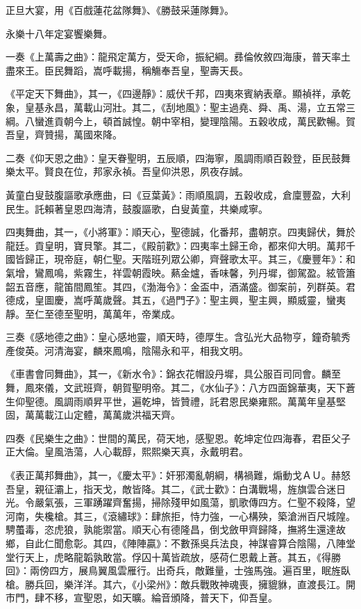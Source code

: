 正旦大宴，用《百戲蓮花盆隊舞》、《勝鼓采蓮隊舞》。

永樂十八年定宴饗樂舞。

一奏《上萬壽之曲》：龍飛定萬方，受天命，振紀綱。彞倫攸敘四海康，普天率土盡來王。臣民舞蹈，嵩呼載揚，稱觴奉吾皇，聖壽天長。

《平定天下舞曲》，其一，《四邊靜》：威伏千邦，四夷來賓納表章。顯禎祥，承乾象，皇基永昌，萬載山河壯。其二，《刮地風》：聖主過堯、舜、禹、湯，立五常三綱。八蠻進貢朝今上，頓首誠惶。朝中宰相，變理陰陽。五穀收成，萬民歡暢。賀吾皇，齊贊揚，萬國來降。

二奏《仰天恩之曲》：皇天眷聖明，五辰順，四海寧，風調雨順百穀登，臣民鼓舞樂太平。賢良在位，邦家永禎。吾皇仰洪恩，夙夜存誠。

黃童白叟鼓腹謳歌承應曲，曰《豆葉黃》：雨順風調，五穀收成，倉廩豐盈，大利民生。託賴著皇恩四海清，鼓腹謳歌，白叟黃童，共樂咸寧。

四夷舞曲，其一，《小將軍》：順天心，聖德誠，化番邦，盡朝京。四夷歸伏，舞於龍廷。貢皇明，寶貝擎。其二，《殿前歡》：四夷率土歸王命，都來仰大明。萬邦千國皆歸正，現帝庭，朝仁聖。天階班列眾公卿，齊聲歌太平。其三，《慶豐年》：和氣增，鸞鳳鳴，紫霧生，祥雲朝霞映。爇金爐，香味馨，列丹墀，御駕盈。絃管簫韶五音應，龍笛間鳳笙。其四，《渤海令》：金盃中，酒滿盛。御案前，列群英。君德成，皇圖慶，嵩呼萬歲聲。其五，《過門子》：聖主興，聖主興，顯威靈，蠻夷靜。至仁至德至聖明，萬萬年，帝業成。

三奏《感地德之曲》：皇心感地靈，順天時，德厚生。含弘光大品物亨，鐘奇毓秀產俊英。河清海宴，麟來鳳鳴，陰陽永和平，相我文明。

《車書會同舞曲》，其一，《新水令》：錦衣花帽設丹墀，具公服百司同會。麟至舞，鳳來儀，文武班齊，朝賀聖明帝。其二，《水仙子》：八方四面錦華夷，天下蒼生仰聖德。風調雨順昇平世，遍乾坤，皆贊禮，託君恩民樂雍熙。萬萬年皇基堅固，萬萬載江山定體，萬萬歲洪福天齊。

四奏《民樂生之曲》：世間的萬民，荷天地，感聖恩。乾坤定位四海春，君臣父子正大倫。皇風浩蕩，人心載醇，熙熙樂天真，永戴明君。

《表正萬邦舞曲》，其一，《慶太平》：奸邪濁亂朝綱，構禍難，煽動戈ＡＵ。赫怒吾皇，親征灞上，指天戈，敵皆降。其二，《武士歡》：白溝戰場，旌旗雲合迷日光。令嚴氣張，三軍踴躍齊奮揚，掃除殘甲如風蕩，凱歌傳四方。仁聖不殺降，望河南，失欃槍。其三，《滾繡球》：肆旅拒，恃力強，一心構殃，築滄洲百尺城隍。騁蠆毒，恣虎狼，孰能禦當。順天心有德隆昌，倒戈斂甲齊歸降，撫將生還達故鄉，自此仁聞愈彰。其四，《陣陣贏》：不數孫吳兵法良，神謀睿算合陰陽，八陣堂堂行天上，虎略龍韜孰敢當。俘囚十萬皆疏放，感荷仁恩戴上蒼。其五，《得勝回》：兩傍四方，展鳥翼風雲雁行。出奇兵，敵難量，士強馬強。遍百里，眠旌臥槍。勝兵回，樂洋洋。其六，《小梁州》：敵兵戰敗神魂喪，擁貔貅，直渡長江。開市門，肆不移，宣聖恩，如天曠。綸音頒降，普天下，仰吾皇。

